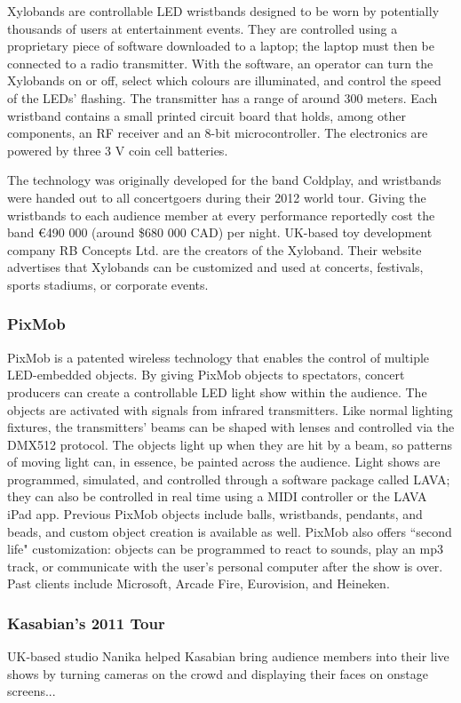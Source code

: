 Xylobands are controllable LED wristbands designed to be worn by potentially thousands of users at entertainment events. They are controlled using a proprietary piece of software downloaded to a laptop; the laptop must then be connected to a radio transmitter. With the software, an operator can turn the Xylobands on or off, select which colours are illuminated, and control the speed of the LEDs' flashing. The transmitter has a range of around 300 meters. Each wristband contains a small printed circuit board that holds, among other components, an RF receiver and an 8-bit microcontroller. The electronics are powered by three 3 V coin cell batteries.

The technology was originally developed for the band Coldplay, and wristbands were handed out to all concertgoers during their 2012 world tour. Giving the wristbands to each audience member at every performance reportedly cost the band \euro{}490 000 (around \$680 000 CAD) per night. UK-based toy development company RB Concepts Ltd. are the creators of the Xyloband. Their website advertises that Xylobands can be customized and used at concerts, festivals, sports stadiums, or corporate events.

\subsubsection{PixMob}

PixMob is a patented wireless technology that enables the control of multiple LED-embedded objects. By giving PixMob objects to spectators, concert producers can create a controllable LED light show within the audience. The objects are activated with signals from infrared transmitters. Like normal lighting fixtures, the transmitters' beams can be shaped with lenses and controlled via the DMX512 protocol. The objects light up when they are hit by a beam, so patterns of moving light can, in essence, be painted across the audience. Light shows are programmed, simulated, and controlled through a software package called LAVA; they can also be controlled in real time using a MIDI controller or the LAVA iPad app. Previous PixMob objects include balls, wristbands, pendants, and beads, and custom object creation is available as well. PixMob also offers ``second life" customization: objects can be programmed to react to sounds, play an mp3 track, or communicate with the user's personal computer after the show is over. Past clients include Microsoft, Arcade Fire, Eurovision, and Heineken.

\subsubsection{Kasabian's 2011 Tour}

UK-based studio Nanika helped Kasabian bring audience members into their live shows by turning cameras on the crowd and displaying their faces on onstage screens...
